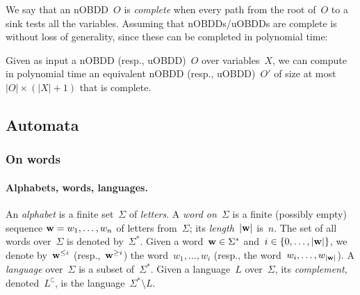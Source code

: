 	We say that an nOBDD~$O$ is \emph{complete} when every path from the
root of~$O$ to a sink tests all the variables. Assuming that nOBDDs/uOBDDs are
complete is without loss of generality, since these can be completed in
polynomial time:
\begin{lemma}[Folklore]
\label{lem:nOBDD-complete}
Given as input a nOBDD (resp., uOBDD)~$O$ over variables~$X$, we can compute in
polynomial time an equivalent nOBDD (resp., uOBDD)~$O'$ of size at most~$|O|
\times (|X|+1)$ that is complete.
\end{lemma}

\subsection{Automata}
\label{subsec:UFAs}

\subsubsection{On words}
\label{subsubsec:ufas-words}

\paragraph*{Alphabets, words, languages.}
An \emph{alphabet} is a finite set~$\Sigma$ of \emph{letters}.  A \emph{word
on~$\Sigma$} is a finite (possibly empty) sequence $\mathbf{w} = w_1,\ldots,w_n$ of
letters from~$\Sigma$; its \emph{length}~$|\mathbf{w}|$ is~$n$.  The set of all words
over~$\Sigma$ is denoted by~$\Sigma^*$.  Given a word~$\mathbf{w} \in \Sigma^*$ and~$i
\in \{0,\ldots,|\mathbf{w}|\}$, we denote by~$\mathbf{w}^{\leq i}$ (resp.,~$\mathbf{w}^{\geq i}$) the
word~$w_1,\ldots,w_i$ (resp., the word~$w_i,\ldots,w_{|\mathbf{w}|}$).  A \emph{
language} over~$\Sigma$ is a subset of~$\Sigma^*$. Given a language~$L$
over~$\Sigma$, its \emph{complement}, denoted~$L^\complement$, is the
language~$\Sigma^* \setminus L$.


